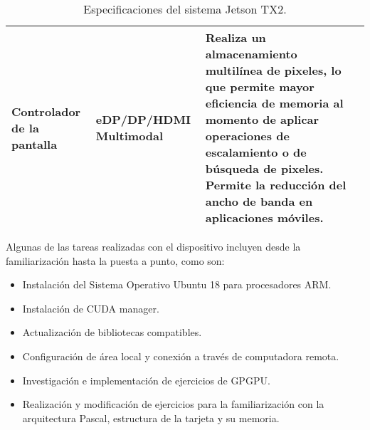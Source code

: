 \begin{table}[h!]
\begin{center}
\begin{tabular}{|m{2.5cm}|m{6cm}|m{6.5cm}|}
         \hline
   	 \textbf{Controlador de la pantalla} &eDP/DP/HDMI Multimodal & Realiza un almacenamiento multilínea de pixeles, lo que permite mayor eficiencia de memoria al momento de aplicar operaciones de escalamiento o de búsqueda de pixeles. Permite la reducción del ancho de banda en aplicaciones móviles.\\
         \hline
        \end{tabular}
        \caption{Especificaciones del sistema Jetson TX2\cite{jtx2dk}.}
        \label{tab:jetson}
      \end{center}
    \end{table}
       
   Algunas de las tareas realizadas con el dispositivo incluyen desde la familiarización hasta la puesta a punto, como son:
   \begin{itemize}
    \item Instalación del Sistema Operativo Ubuntu 18 para procesadores ARM.
     \item Instalación de CUDA manager.
     \item Actualización de bibliotecas compatibles.
     \item Configuración de área local y conexión a través de computadora remota.
      \item Investigación e implementación de ejercicios de GPGPU.
       \item Realización y modificación de ejercicios para la familiarización con la arquitectura Pascal, estructura de la tarjeta y su memoria.
    \end{itemize}   
   
